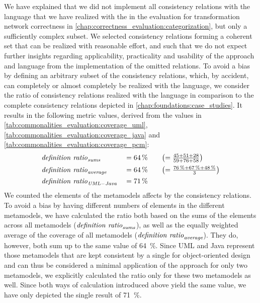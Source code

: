 We have explained that we did not implement all consistency relations with the \commonalities language that we have realized with the \reactionslanguage in the evaluation for transformation network correctness in \autoref{chap:correctness_evaluation:categorization}, but only a sufficiently complex subset.
We selected consistency relations forming a coherent set that can be realized with reasonable effort, and such that we do not expect further insights regarding applicability, practicality and usability of the \commonalities approach and language from the implementation of the omitted relations.
To avoid a bias by defining an arbitrary subset of the consistency relations, which, by accident, can completely or almost completely be realized with the \commonalities language, we consider the ratio of consistency relations realized with the \commonalities language in comparison to the complete consistency relations depicted in \autoref{chap:foundations:case_studies}.
It results in the following metric values, derived from the values in \autoref{tab:commonalities_evaluation:coverage_uml}, \autoref{tab:commonalities_evaluation:coverage_java} and \autoref{tab:commonalities_evaluation:coverage_pcm}:
\begin{alignat*}{3}
    &
	\mathit{definition\ ratio}_{\mathit{sums}} &&= \SI{64}{\percent} \quad  &&\bigl(= \tfrac{45 + 51 + 28}{59 + 76 + 58}\bigr)\\
	& 
	\mathit{definition\ ratio}_{\mathit{average}} &&= \SI{64}{\percent} \quad &&\bigl(= \tfrac{\SI{76}{\percent} + \SI{67}{\percent} + \SI{48}{\percent}}{3} \bigr) \\
	&
	\mathit{definition\ ratio}_{\mathit{UML-Java}} &&= \SI{71}{\percent}
\end{alignat*}
We counted the elements of the metamodels affects by the consistency relations.
To avoid a bias by having different numbers of elements in the different metamodels, we have calculated the ratio both based on the sums of the elements across all metamodels ($\mathvariable{definition\ ratio}_{\mathvariable{sums}}$), as well as the equally weighted average of the coverage of all metamodels ($\mathvariable{definition\ ratio}_{\mathvariable{average}}$).
They do, however, both sum up to the same value of \SI{64}{\percent}.
Since \gls{UML} and Java represent those metamodels that are kept consistent by a single \conceptmetamodel for object-oriented design and can thus be considered a minimal application of the \commonalities approach for only two metamodels, we explicitly  calculated the ratio only for these two metamodels as well.
Since both ways of calculation introduced above yield the same value, we have only depicted the single result of \SI{71}{\percent}.

